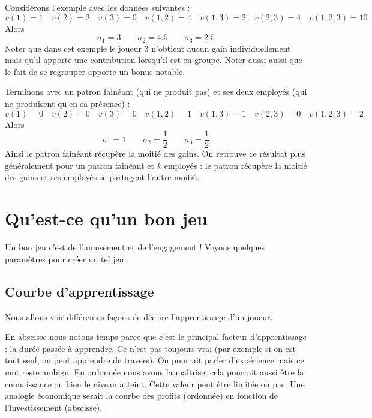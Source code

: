 \documentclass[11pt,class=report,crop=false]{standalone}
\begin{document}
\medskip

Considérons l'exemple avec les données suivantes :
$$v(1) = 1 \quad v(2) = 2 \quad v(3) = 0
\quad v(1,2) = 4 \quad v(1,3) = 2 \quad v(2,3) = 4 \quad v(1,2,3) = 10$$
Alors 
$$\sigma_1 = 3 \qquad \sigma_2 = 4.5 \qquad \sigma_3 = 2.5$$
Noter que dans cet exemple le joueur 3 n'obtient aucun gain individuellement mais qu'il apporte une contribution lorsqu'il est en groupe. Noter aussi aussi que le fait de se regrouper apporte un bonus notable.

\medskip

Terminons avec un patron fainéant (qui ne produit pas) et ses deux employés (qui ne produisent qu'en sa présence) :
$$v(1)=0  \quad v(2) = 0 \quad v(3) = 0
\quad v(1,2) = 1 \quad v(1,3) = 1 \quad v(2,3) = 0 \quad v(1,2,3) = 2$$
Alors 
$$\sigma_1 = 1 \qquad \sigma_2 = \frac12 \qquad \sigma_3 = \frac12$$
Ainsi le patron fainéant récupère la moitié des gains.
On retrouve ce résultat plus généralement pour un patron fainéant et $k$ employés : le patron récupère la moitié des gains et ses employés se partagent l'autre moitié.



\section{Qu'est-ce qu'un \og{}bon\fg{} jeu}

Un bon jeu c'est de l'amusement et de l'engagement ! Voyons quelques paramètres pour créer un tel jeu.

\subsection{Courbe d'apprentissage}


Nous allons voir différentes façons de décrire l'apprentissage d'un joueur.


En abscisse nous notons \og{}temps\fg{} parce que c'est le principal facteur d'apprentissage : la durée passée à apprendre. Ce n'est pas toujours vrai (par exemple si on est tout seul, on peut apprendre de travers). On pourrait parler d'\og{}expérience\fg{} mais ce mot reste ambigu.
En ordonnée nous avons la \og{}maîtrise\fg{}, cela pourrait aussi être la \og{}connaissance\fg{} ou bien le \og{}niveau\fg{} atteint. Cette valeur peut être limitée ou pas.
Une analogie économique serait la courbe des \og{}profits\fg{} (ordonnée) en fonction de l'\og{}investissement\fg{} (abscisse).
\end{document}
